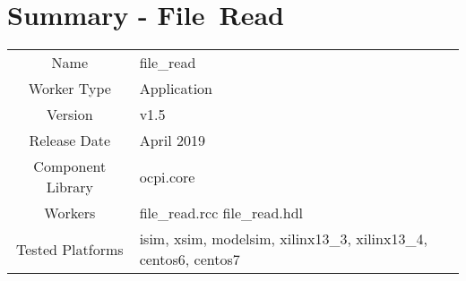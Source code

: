 \documentclass{article}
\author{} %
\date{Version \docVersion} %
\title{\docTitle}
\def\docVersion{1.5}
\def\comp{file\_read}
\def\Comp{File\ Read }
\begin{document}
\section*{Summary - \Comp}
\begin{tabular}{|c|M{13.5cm}|}
	\hline
	                  &                                                                                \\
	\hline
	Name              & \comp                                                                          \\
	\hline
	Worker Type       & Application                                                                    \\
	\hline
	Version           &  v\docVersion \\
	\hline
	Release Date      &  April 2019 \\
	\hline
	Component Library &   ocpi.core\\
	\hline
	Workers           &  file\_read.rcc file\_read.hdl\\
	\hline
	Tested Platforms  &  isim, xsim, modelsim, xilinx13\_3, xilinx13\_4, centos6, centos7\\
	\hline
\end{tabular}
\end{document}

